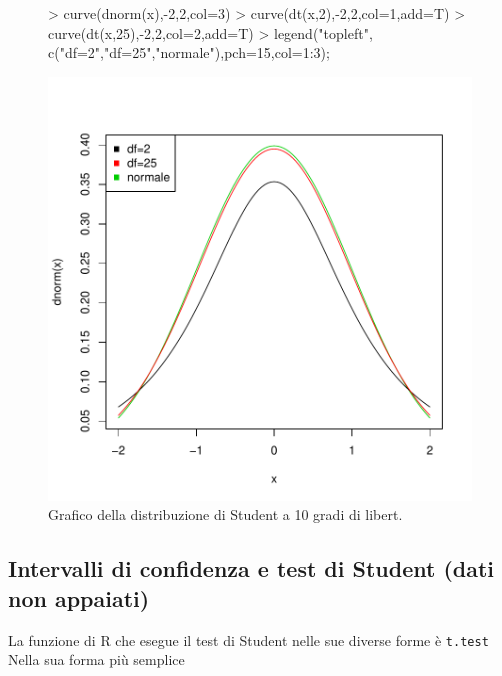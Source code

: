 \documentclass[onecolumn,12pt]{book}
\begin{document}
\begin{figure}[htbp]
\begin{center}
\begin{Schunk}
\begin{Sinput}
> curve(dnorm(x),-2,2,col=3)
> curve(dt(x,2),-2,2,col=1,add=T)
> curve(dt(x,25),-2,2,col=2,add=T)
> legend("topleft", c("df=2","df=25","normale"),pch=15,col=1:3);
\end{Sinput}
\end{Schunk}
\includegraphics{RbookParte2-069}
\caption{Grafico della distribuzione di Student a 10 gradi di libert. }
\label{fig:graficostudent}
\end{center}
\end{figure}
 \subsection
{Intervalli di confidenza e test di Student (dati non appaiati)}
La funzione di
\textsf{R} che esegue il test di Student nelle sue diverse forme \`e  \texttt{t.test}   Nella sua forma pi\`u semplice
\end{document}
